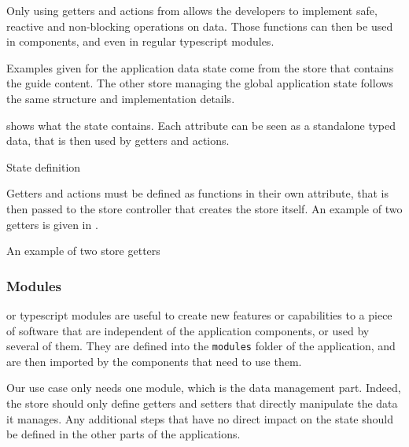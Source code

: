 Only using getters and actions from  allows the developers to implement safe, reactive and non-blocking operations on data. Those functions can then be used in  components, and even in regular \gls{typescript} modules.

Examples given for the application data state come from the store that contains the guide content. The other store managing the global application state follows the same structure and implementation details.

 shows what the state contains. Each attribute can be seen as a standalone typed data, that is then used by getters and actions.

\begin{listing}[!ht] 
	\caption{State definition}
	\label{lst:state_definition}
\end{listing}

Getters and actions must be defined as functions in their own attribute, that is then passed to the  store controller that creates the store itself. An example of two getters is given in .

\begin{listing}[!ht] 
	\caption{An example of two store getters}
	\label{lst:state_getter}
\end{listing}

\subsubsection{Modules}
\label{subsubsec:app_implementation_basics_modules}

 or \gls{typescript} modules are useful to create new features or capabilities to a piece of software that are independent of the application components, or used by several of them. They are defined into the \texttt{modules} folder of the application, and are then imported by the components that need to use them.

Our use case only needs one module, which is the data management part. Indeed, the  store should only define getters and setters that directly manipulate the data it manages. Any additional steps that have no direct impact on the state should be defined in the other parts of the applications.

